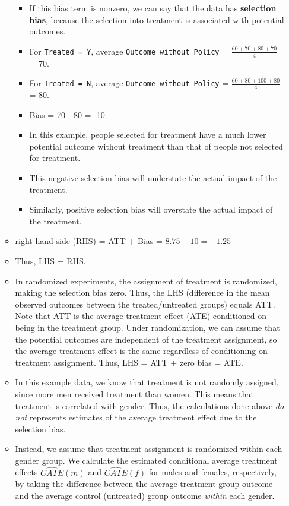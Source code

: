 \documentclass[]{book}
\providecommand{\tightlist}{%
  \setlength{\itemsep}{0pt}\setlength{\parskip}{0pt}}
\begin{document}
\begin{itemize}
\begin{itemize}
    \begin{itemize}
    \tightlist
    \item
      If this bias term is nonzero, we can say that the data has \textbf{selection bias}, because the selection into treatment is associated with potential outcomes.
    \item
      For \texttt{Treated\ =\ Y}, average \texttt{Outcome\ without\ Policy} = \(\frac{60+70+80+70}{4}\) = 70.
    \item
      For \texttt{Treated\ =\ N}, average \texttt{Outcome\ without\ Policy} = \(\frac{60+80+100+80}{4}\) = 80.
    \item
      Bias = 70 - 80 = -10.
    \item
      In this example, people selected for treatment have a much lower potential outcome without treatment than that of people not selected for treatment.
    \item
      This negative selection bias will understate the actual impact of the treatment.
    \item
      Similarly, positive selection bias will overstate the actual impact of the treatment.
    \end{itemize}
  \item
    right-hand side (RHS) = ATT + Bias = \(8.75 - 10 = -1.25\)
  \item
    Thus, LHS = RHS.
  \item
    In randomized experiments, the assignment of treatment is randomized, making the selection bias zero. Thus, the LHS (difference in the mean observed outcomes between the treated/untreated groups) equals ATT. Note that ATT is the average treatment effect (ATE) conditioned on being in the treatment group. Under randomization, we can assume that the potential outcomes are independent of the treatment assignment, so the average treatment effect is the same regardless of conditioning on treatment assignment. Thus, LHS = ATT + zero bias = ATE.
  \item
    In this example data, we know that treatment is not randomly assigned, since more men received treatment than women. This means that treatment is correlated with gender. Thus, the calculations done above \emph{do not} represents estimates of the average treatment effect due to the selection bias.
  \item
    Instead, we assume that treatment assignment is randomized within each gender group. We calculate the estimated conditional average treatment effects \(\widehat{CATE}(m)\) and \(\widehat{CATE}(f)\) for males and females, respectively, by taking the difference between the average treatment group outcome and the average control (untreated) group outcome \emph{within} each gender.


\end{itemize}
\end{itemize}
\end{document}
